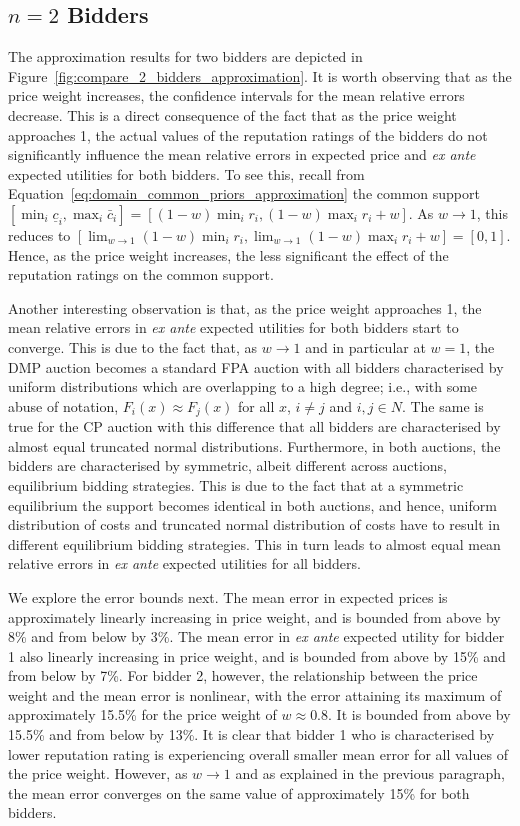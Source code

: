 \subsection{$n=2$ Bidders} %
\label{sub:n_2_bidders_approximation}
The approximation results for two bidders are depicted in Figure~\ref{fig:compare_2_bidders_approximation}. It is worth observing that as the price weight increases, the confidence intervals for the mean relative errors decrease. This is a direct consequence of the fact that as the price weight approaches 1, the actual values of the reputation ratings of the bidders do not significantly influence the mean relative errors in expected price and \emph{ex ante} expected utilities for both bidders. To see this, recall from Equation~\eqref{eq:domain_common_priors_approximation} the common support $[\min_i{\underline{c}_i}, \max_i{\bar{c}_i}]=[(1-w)\min_i{r_i}, (1-w)\max_i{r_i} + w]$. As $w\to 1$, this reduces to $[\lim_{w\to 1}(1-w)\min_i{r_i}, \lim_{w\to 1}(1-w)\max_i{r_i} + w] = [0,1]$. Hence, as the price weight increases, the less significant the effect of the reputation ratings on the common support.

Another interesting observation is that, as the price weight approaches 1, the mean relative errors in \emph{ex ante} expected utilities for both bidders start to converge. This is due to the fact that, as $w\to 1$ and in particular at $w=1$, the DMP auction becomes a standard FPA auction with all bidders characterised by uniform distributions which are overlapping to a high degree; i.e., with some abuse of notation, $F_i(x)\approx F_j(x)$ for all $x$, $i\neq j$ and $i,j\in N$. The same is true for the CP auction with this difference that all bidders are characterised by almost equal truncated normal distributions. Furthermore, in both auctions, the bidders are characterised by symmetric, albeit different across auctions, equilibrium bidding strategies. This is due to the fact that at a symmetric equilibrium the support becomes identical in both auctions, and hence, uniform distribution of costs and truncated normal distribution of costs have to result in different equilibrium bidding strategies. This in turn leads to almost equal mean relative errors in \emph{ex ante} expected utilities for all bidders.

We explore the error bounds next. The mean error in expected prices is approximately linearly increasing in price weight, and is bounded from above by 8\% and from below by 3\%. The mean error in \emph{ex ante} expected utility for bidder 1 also linearly increasing in price weight, and is bounded from above by 15\% and from below by 7\%. For bidder 2, however, the relationship between the price weight and the mean error is nonlinear, with the error attaining its maximum of approximately 15.5\% for the price weight of $w\approx 0.8$. It is bounded from above by 15.5\% and from below by 13\%. It is clear that bidder 1 who is characterised by lower reputation rating is experiencing overall smaller mean error for all values of the price weight. However, as $w\to 1$ and as explained in the previous paragraph, the mean error converges on the same value of approximately 15\% for both bidders.

